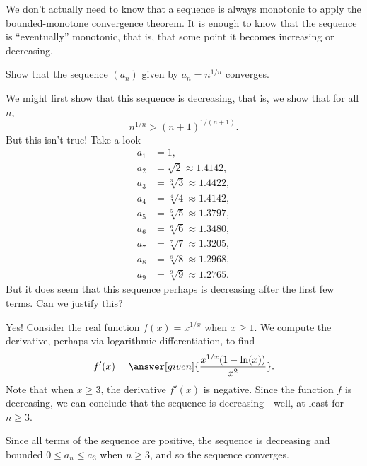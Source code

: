 \documentclass{ximera}
\begin{document}

\begin{remark}
We don't actually need to know that a sequence is always monotonic to apply
the bounded-monotone convergence theorem. It is enough to know that
the sequence is ``eventually'' monotonic, that is, that some point it
becomes increasing or decreasing.
\end{remark}

\begin{example}
Show that the sequence $(a_n)$ given by $a_n = n^{1/n}$ converges.
\begin{explanation}
  We might first show that this sequence is decreasing, that is, we show
  that for all $n$,
  \[
  n^{1/n} > (n+1)^{1/(n+1)}.
  \]
  But this isn't true!  Take a look
  \begin{align*}
    a_1 &= 1, \\
    a_2 &= \sqrt{2} \approx 1.4142, \\
    a_3 &= \sqrt[3]{3} \approx 1.4422, \\
    a_4 &= \sqrt[4]{4} \approx 1.4142, \\
    a_5 &= \sqrt[5]{5} \approx 1.3797, \\
    a_6 &= \sqrt[6]{6} \approx 1.3480, \\
    a_7 &= \sqrt[7]{7} \approx 1.3205, \\
    a_8 &= \sqrt[8]{8} \approx 1.2968, \\
    a_9 &= \sqrt[9]{9} \approx 1.2765.
  \end{align*}
  But it does seem that this sequence perhaps is decreasing after the
  first few terms.  Can we justify this?

  Yes!  Consider the real function $f(x)=x^{1/x}$ when $x\ge 1$.  We
  compute the derivative, perhaps via logarithmic differentiation, to find
  \[
  f'(x)=\answer[given]{\frac{x^{1/x} (1-\ln(x))}{x^2}}.
  \]
  Note that when $x\ge 3$, the derivative $f'(x)$ is negative.  Since
  the function $f$ is decreasing, we can conclude that the sequence is
  decreasing---well, at least for $n \geq 3$.

  Since all terms of the sequence are positive, the sequence is
  decreasing and bounded $0\le a_n \le a_3$ when $n \ge 3$, and so the
  sequence converges.
\end{explanation}
\end{example}
\end{document}
